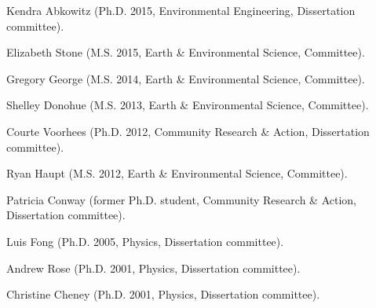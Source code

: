 \item Kendra Abkowitz (Ph.D. 2015, Environmental Engineering, Dissertation committee).
\item Elizabeth Stone (M.S. 2015, Earth \& Environmental Science, Committee).
\item Gregory George (M.S. 2014, Earth \& Environmental Science, Committee).
\item Shelley Donohue (M.S. 2013, Earth \& Environmental Science, Committee).
\item Courte Voorhees (Ph.D. 2012,  Community Research \& Action, Dissertation committee).
\item Ryan Haupt (M.S. 2012, Earth \& Environmental Science, Committee).
\item Patricia Conway (former Ph.D. student, Community Research \& Action, Dissertation committee).
\item Luis Fong (Ph.D. 2005, Physics, Dissertation committee).
\item Andrew Rose (Ph.D. 2001, Physics, Dissertation committee).
\item Christine Cheney (Ph.D. 2001, Physics, Dissertation committee).
